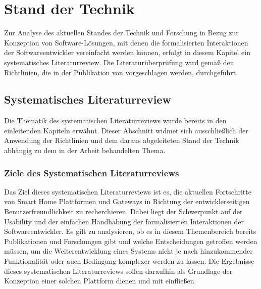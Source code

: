 \chapter{Stand der Technik}
\label{chap:technikStand}
    Zur Analyse des aktuellen Standes der Technik und Forschung in Bezug zur Konzeption von Software-Lösungen, mit denen 
    die formalisierten Interaktionen der Softwareentwickler vereinfacht werden können, erfolgt in diesem 
    Kapitel ein systematisches Literaturreview. Die Literaturüberprüfung wird gemäß den Richtlinien, die in der Publikation 
    von %
    vorgeschlagen werden, durchgeführt. 


    \section{Systematisches Literaturreview}
    \label{subsec:systematischesLiteraturReview}
        Die Thematik des systematischen Literaturreviews wurde bereits in den einleitenden Kapiteln erwähnt. 
        Dieser Abschnitt widmet sich ausschließlich der Anwendung der Richtlinien und dem daraus abgeleiteten Stand der Technik 
        abhängig zu dem in der Arbeit behandelten Thema. 

    \subsection{Ziele des Systematischen Literaturreviews}
        Das Ziel dieses systematischen Literaturreviews ist es, die aktuellen Fortschritte von Smart Home Plattformen und 
        Gateways in Richtung der entwicklerseitigen Benutzerfreundlichkeit zu recherchieren. Dabei liegt der Schwerpunkt 
        auf der Usability und der einfachen Handhabung der formalisierten Interaktionen der Softwareentwickler. Es gilt zu 
        analysieren, ob es in diesem Themenbereich bereits Publikationen und Forschungen gibt und welche Entscheidungen 
        getroffen werden müssen, um die Weiterentwicklung eines Systems nicht je nach hinzukommender Funktionalität oder 
        auch Bedingung komplexer werden zu lassen. Die Ergebnisse dieses systematischen Literaturreviews sollen daraufhin 
        als Grundlage der Konzeption einer solchen Plattform dienen und mit einfließen. 

